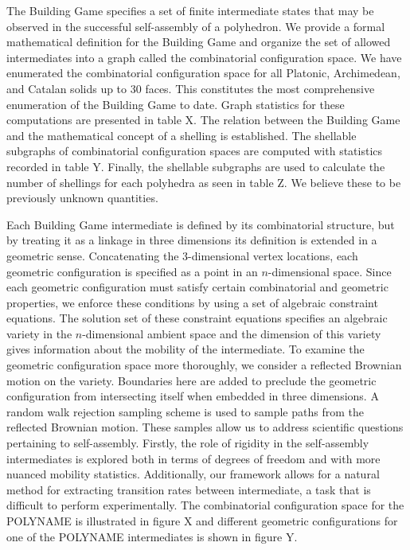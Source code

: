 The Building Game specifies a set of finite intermediate states that may be observed in the successful self-assembly of a polyhedron. We provide a formal mathematical definition for the Building Game and organize the set of allowed intermediates into a graph called the combinatorial configuration space. We have enumerated the combinatorial configuration space for all Platonic, Archimedean, and Catalan solids up to 30 faces. This constitutes the most comprehensive enumeration of the Building Game to date. Graph statistics for these computations are presented in table X. The relation between the Building Game and the mathematical concept of a shelling is established. The shellable subgraphs of combinatorial configuration spaces are computed with statistics recorded in table Y. Finally, the shellable subgraphs are used to calculate the number of shellings for each polyhedra as seen in table Z. We believe these to be previously unknown quantities. 
 





Each Building Game intermediate is defined by its combinatorial structure, but by treating it as a linkage in three dimensions its definition is extended in a geometric sense. Concatenating the 3-dimensional vertex locations, each geometric configuration is specified as a point in an $n$-dimensional space. Since each geometric configuration must satisfy certain combinatorial and geometric properties, we enforce these conditions by using a set of algebraic constraint equations. The solution set of these constraint equations specifies an algebraic variety in the $n$-dimensional ambient space and the dimension of this variety gives information about the mobility of the intermediate. To examine the geometric configuration space more thoroughly, we consider a reflected Brownian motion on the variety. Boundaries here are added to preclude the geometric configuration from intersecting itself when embedded in three dimensions. A random walk rejection sampling scheme is used to sample paths from the reflected Brownian motion. These samples allow us to address scientific questions pertaining to self-assembly. Firstly, the role of rigidity in the self-assembly intermediates is explored both in terms of degrees of freedom and with more nuanced mobility statistics. Additionally, our framework allows for a natural method for extracting transition rates between intermediate, a task that is difficult to perform experimentally. The combinatorial configuration space for the POLYNAME is illustrated in figure X and different geometric configurations for one of the POLYNAME intermediates is shown in figure Y.


